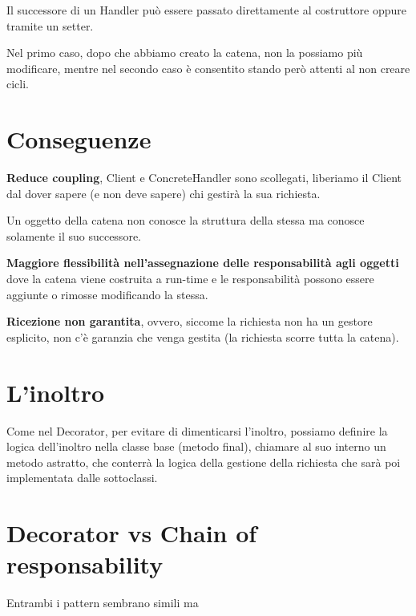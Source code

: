 Il successore di un Handler può essere passato direttamente al costruttore oppure tramite un setter.

Nel primo caso, dopo che abbiamo creato la catena, non la possiamo più modificare, mentre nel secondo caso è consentito stando però attenti al non creare cicli.

\section{Conseguenze}

\textbf{Reduce coupling}, Client e ConcreteHandler sono scollegati, liberiamo il Client dal dover sapere (e non deve sapere) chi gestirà la sua richiesta. 

Un oggetto della catena non conosce la struttura della stessa ma conosce solamente il suo successore.

\textbf{Maggiore flessibilità nell'assegnazione delle responsabilità agli oggetti} dove la catena viene costruita a run-time e le responsabilità possono essere 
aggiunte o rimosse modificando la stessa.

\textbf{Ricezione non garantita}, ovvero, siccome la richiesta non ha un gestore esplicito, non c'è garanzia che venga gestita (la richiesta scorre tutta la catena).

\section{L'inoltro}

Come nel Decorator, per evitare di dimenticarsi l'inoltro, possiamo definire la logica dell'inoltro nella classe base (metodo final), chiamare al suo interno un metodo 
astratto, che conterrà la logica della gestione della richiesta che sarà poi implementata dalle sottoclassi.

\section{Decorator vs Chain of responsability}

Entrambi i pattern sembrano simili ma 

